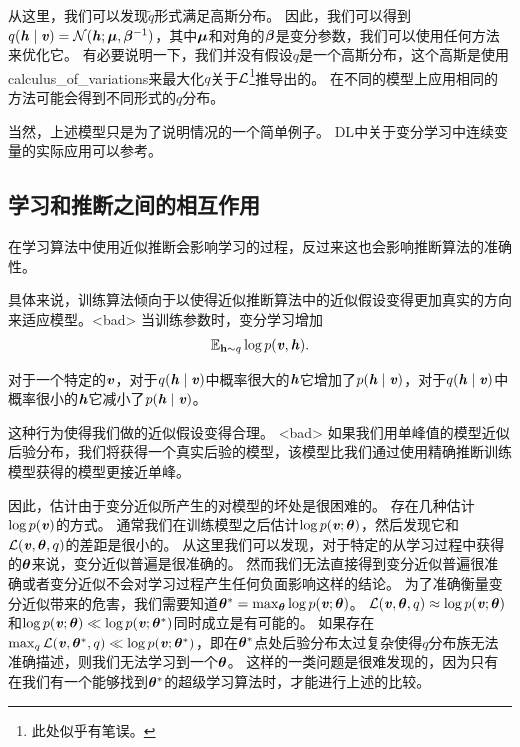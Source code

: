 从这里，我们可以发现$\tilde{q}$形式满足高斯分布。
因此，我们可以得到$q(\Vh\mid\Vv) = \CalN(\Vh;\Vmu,\Vbeta^{-1})$，其中$\Vmu$和对角的$\Vbeta$是变分参数，我们可以使用任何方法来优化它。
有必要说明一下，我们并没有假设$q$是一个高斯分布，这个高斯是使用\gls{calculus_of_variations}来最大化$q$关于$\CalL$\footnote{此处似乎有笔误。}推导出的。
在不同的模型上应用相同的方法可能会得到不同形式的$q$分布。

当然，上述模型只是为了说明情况的一个简单例子。
\gls{DL}中关于变分学习中连续变量的实际应用可以参考\citet{Goodfeli-et-al-TPAMI-Deep-PrePrint-2013-small}。



\subsection{学习和推断之间的相互作用}
\label{sec:interactions_between_learning_and_inference}


在学习算法中使用近似推断会影响学习的过程，反过来这也会影响推断算法的准确性。


具体来说，训练算法倾向于以使得近似推断算法中的近似假设变得更加真实的方向来适应模型。<bad>
当训练参数时，变分学习增加
\begin{align}
\label{eqn:1968}
	\SetE_{\RVh \sim q}\log p(\Vv,\Vh).
\end{align}

对于一个特定的$\Vv$，对于$q(\Vh \mid \Vv)$中概率很大的$\Vh$它增加了$p(\Vh\mid\Vv)$，对于$q(\Vh \mid \Vv)$中概率很小的$\Vh$它减小了$p(\Vh\mid\Vv)$。

这种行为使得我们做的近似假设变得合理。 %
<bad> 如果我们用单峰值的模型近似后验分布，我们将获得一个真实后验的模型，该模型比我们通过使用精确推断训练模型获得的模型更接近单峰。


因此，估计由于变分近似所产生的对模型的坏处是很困难的。
存在几种估计$\log p(\Vv)$的方式。
通常我们在训练模型之后估计$\log p(\Vv;\Vtheta)$，然后发现它和$\CalL(\Vv,\Vtheta,q)$的差距是很小的。
从这里我们可以发现，对于特定的从学习过程中获得的$\Vtheta$来说，变分近似普遍是很准确的。
然而我们无法直接得到变分近似普遍很准确或者变分近似不会对学习过程产生任何负面影响这样的结论。
为了准确衡量变分近似带来的危害，我们需要知道$\Vtheta^* = \max_{\Vtheta} \log p(\Vv;\Vtheta)$。
$\CalL(\Vv,\Vtheta,q)\approx \log p(\Vv;\Vtheta)$和$\log p(\Vv;\Vtheta)\ll \log p(\Vv;\Vtheta^*)$同时成立是有可能的。
如果存在$\max_q \CalL(\Vv,\Vtheta^*,q)\ll \log p(\Vv;\Vtheta^*)$，即在$\Vtheta^*$点处后验分布太过复杂使得$q$分布族无法准确描述，则我们无法学习到一个$\Vtheta$。
这样的一类问题是很难发现的，因为只有在我们有一个能够找到$\Vtheta^*$的超级学习算法时，才能进行上述的比较。



